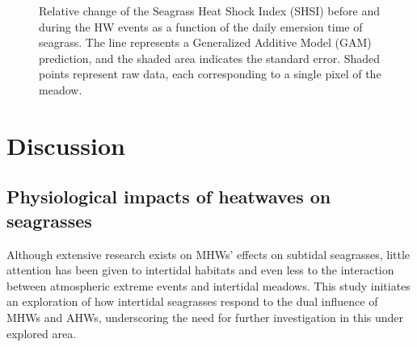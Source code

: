 \documentclass[
  letterpaper,
  11pt,
  english,
  singlespacing,
  headsepline]{MastersDoctoralThesis}
\begin{document}
\begin{spacing}{1.5}
\begin{figure}


\caption{\label{fig-GAM_Emersion}Relative change of the Seagrass Heat
Shock Index (SHSI) before and during the HW events as a function of the
daily emersion time of seagrass. The line represents a Generalized
Additive Model (GAM) prediction, and the shaded area indicates the
standard error. Shaded points represent raw data, each corresponding to
a single pixel of the meadow.}

\end{figure}%

\section{Discussion}\label{discussion-3}

\subsection{Physiological impacts of heatwaves on
seagrasses}\label{physiological-impacts-of-heatwaves-on-seagrasses}

Although extensive research exists on MHWs' effects on subtidal
seagrasses, little attention has been given to intertidal habitats and
even less to the interaction between atmospheric extreme events and
intertidal meadows. This study initiates an exploration of how
intertidal seagrasses respond to the dual influence of MHWs and AHWs,
underscoring the need for further investigation in this under explored
area.


\end{spacing}
\end{document}
